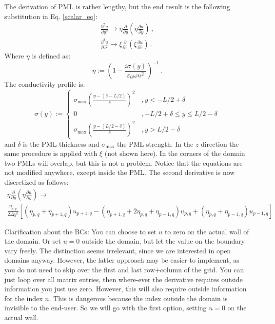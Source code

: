 \documentclass[]{article}
\begin{document}
	The derivation of PML is rather lengthy, but the end result is the following substitution in Eq. \eqref{scalar_eq}:
	\begin{subequations}
		\begin{align}
			\frac{\partial^2 u}{\partial y^2} \to \eta \frac{\partial}{\partial y}\left(  \eta \frac{\partial u}{\partial y}\right) \, ,\\
			\frac{\partial^2 u}{\partial z^2} \to \xi \frac{\partial}{\partial z}\left(  \xi \frac{\partial u}{\partial z}\right) \, .
		\end{align}
	\end{subequations}
	Where $\eta$ is defined as:
	\begin{equation}
		\eta := \left(1-\frac{i\sigma(y)}{\varepsilon_0 \omega n^2} \right)^{-1}\, .
	\end{equation}
	The conductivity profile is:
	\begin{equation}
		\sigma(y):= \begin{cases}
			\sigma_{\text{max}}\left( \frac{y-(\delta-L/2)}{\delta}\right)^2 \, &, y <-L/2+\delta\\
			0&, -L/2+\delta \le y \le L/2 - \delta\\
			\sigma_{\text{max}}\left( \frac{y-(L/2-\delta)}{\delta}\right)^2 \, &, y > L/2 - \delta
		\end{cases}
	\end{equation}
	and $\delta$ is the PML thickness and $\sigma_{\text{max}}$ the PML strength. In the $z$ direction the same procedure is applied with $\xi$ (not shown here). In the corners of the domain two PMLs will overlap, but this is not a problem. Notice that the equations are not modified anywhere, except inside the PML. The second derivative is now discretized as follows:
	\begin{multline}
		\eta \frac{\partial}{\partial y}\left(  \eta \frac{\partial u}{\partial y}\right)  \to\\
		\frac{\eta_{p,q}}{2\Delta y^2}\left[(\eta_{p,q}+\eta_{p+1,q})u_{p+1,q} -(\eta_{p+1,q}+2\eta_{p,q}+\eta_{p-1,q})u_{p,q}+(\eta_{p,q}+\eta_{p-1,q})u_{p-1,q}\right] 
	\end{multline}
	
	
	Clarification about the BCs: You can choose to set $u$ to zero on the actual wall of the domain. Or set $u=0$ outside the domain, but let the value on the boundary vary freely. The distinction seems irrelevant, since we are interested in open domains anyway. However, the latter approach may be easier to implement, as you do not need to skip over the first and last row+column of the grid. You can just loop over all matrix entries, then where-ever the derivative requires outside information you just use zero. However, this will also require outside information for the index $n$. This is dangerous because the index outside the domain is invisible to the end-user. So we will go with the first option, setting $u=0$ on the actual wall.

	
	
	
	
\end{document}
